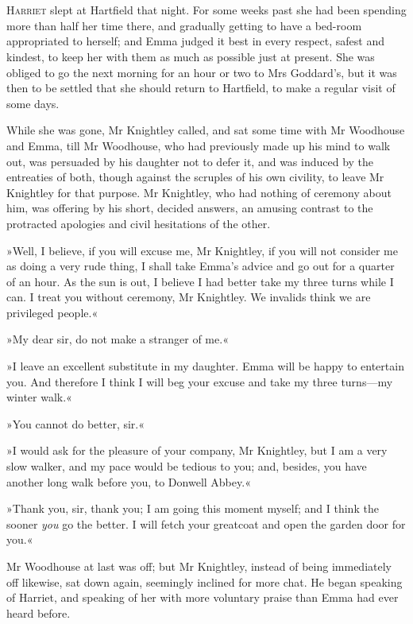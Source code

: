 \chapter[Chapter \thechapter]{}
\lettrine[lines=4,lraise=0.3]{H}{arriet} slept at Hartfield that night. For some weeks past she had been spending more than half her time there, and gradually getting to have a bed-room appropriated to herself; and Emma judged it best in every respect, safest and kindest, to keep her with them as much as possible just at present. She was obliged to go the next morning for an hour or two to Mrs Goddard's, but it was then to be settled that she should return to Hartfield, to make a regular visit of some days.

While she was gone, Mr Knightley called, and sat some time with Mr Woodhouse and Emma, till Mr Woodhouse, who had previously made up his mind to walk out, was persuaded by his daughter not to defer it, and was induced by the entreaties of both, though against the scruples of his own civility, to leave Mr Knightley for that purpose. Mr Knightley, who had nothing of ceremony about him, was offering by his short, decided answers, an amusing contrast to the protracted apologies and civil hesitations of the other.

»Well, I believe, if you will excuse me, Mr Knightley, if you will not consider me as doing a very rude thing, I shall take Emma's advice and go out for a quarter of an hour. As the sun is out, I believe I had better take my three turns while I can. I treat you without ceremony, Mr Knightley. We invalids think we are privileged people.«

»My dear sir, do not make a stranger of me.«

»I leave an excellent substitute in my daughter. Emma will be happy to entertain you. And therefore I think I will beg your excuse and take my three turns—my winter walk.«

»You cannot do better, sir.«

»I would ask for the pleasure of your company, Mr Knightley, but I am a very slow walker, and my pace would be tedious to you; and, besides, you have another long walk before you, to Donwell Abbey.«

»Thank you, sir, thank you; I am going this moment myself; and I think the sooner \textit{you} go the better. I will fetch your greatcoat and open the garden door for you.«

Mr Woodhouse at last was off; but Mr Knightley, instead of being immediately off likewise, sat down again, seemingly inclined for more chat. He began speaking of Harriet, and speaking of her with more voluntary praise than Emma had ever heard before.

